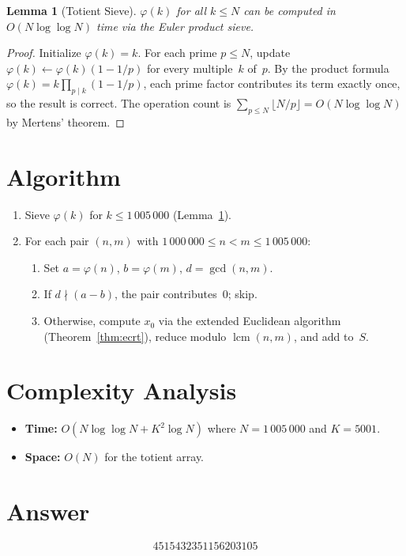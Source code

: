 \documentclass[11pt]{article}
\newtheorem{lemma}[theorem]{Lemma}
\begin{document}
\begin{lemma}[Totient Sieve]\label{lem:sieve}
$\varphi(k)$ for all $k \le N$ can be computed in $O(N\log\log N)$ time via the Euler product sieve.
\end{lemma}

\begin{proof}
Initialize $\varphi(k) = k$. For each prime $p \le N$, update $\varphi(k) \leftarrow \varphi(k)(1 - 1/p)$ for every multiple~$k$ of~$p$. By the product formula $\varphi(k) = k\prod_{p\mid k}(1-1/p)$, each prime factor contributes its term exactly once, so the result is correct. The operation count is $\sum_{p\le N} \lfloor N/p \rfloor = O(N\log\log N)$ by Mertens' theorem.
\end{proof}

\section{Algorithm}

\begin{enumerate}
\item Sieve $\varphi(k)$ for $k \le 1\,005\,000$ (Lemma~\ref{lem:sieve}).
\item For each pair $(n,m)$ with $1\,000\,000 \le n < m \le 1\,005\,000$:
  \begin{enumerate}
  \item Set $a = \varphi(n)$, $b = \varphi(m)$, $d = \gcd(n,m)$.
  \item If $d \nmid (a-b)$, the pair contributes~$0$; skip.
  \item Otherwise, compute $x_0$ via the extended Euclidean algorithm (Theorem~\ref{thm:ecrt}), reduce modulo $\operatorname{lcm}(n,m)$, and add to~$S$.
  \end{enumerate}
\end{enumerate}

\section{Complexity Analysis}

\begin{itemize}
\item \textbf{Time:} $O(N\log\log N + K^2 \log N)$ where $N = 1\,005\,000$ and $K = 5001$.
\item \textbf{Space:} $O(N)$ for the totient array.
\end{itemize}

\section{Answer}

\[
\boxed{4515432351156203105}
\]
\end{document}
